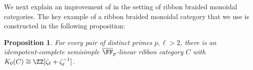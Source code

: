 \documentclass[12pt,oneside]{article}
\newcounter{counter}
\newtheorem{prop}[counter]{Proposition}
\newtheorem{cor}[counter]{Corollary}
\begin{document}


We next explain an improvement of  in the setting of ribbon braided monoidal categories.
The key example of a ribbon braided monoidal category that we use is constructed in the following proposition:

\begin{prop}\label{prop:sl2ribbon}
	For every pair of distinct primes $p, \ell>2$, there is an idempotent-complete semisimple $\overline{\FF}_p$-linear ribbon category $C$ with $K_0(C)\cong \ZZ[\zeta_\ell+\zeta_\ell^{-1}]$.
\end{prop}
\end{document}
